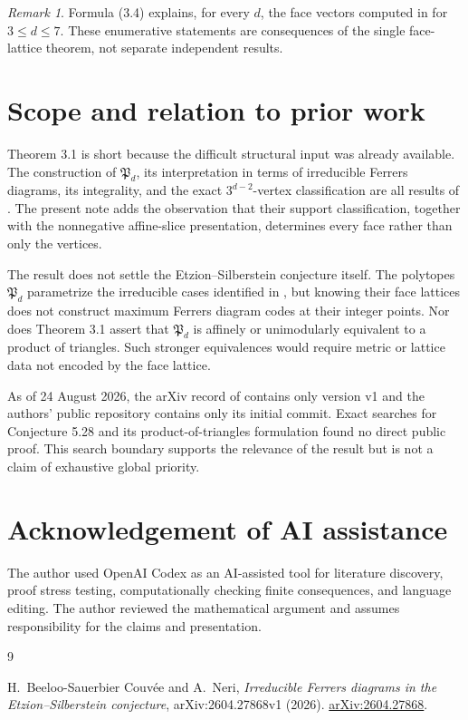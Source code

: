\documentclass[11pt]{article}
\theoremstyle{remark}
\newtheorem{remark}[theorem]{Remark}
\numberwithin{equation}{section}
\begin{document}
\Needspace{0.32\textheight}
\begin{remark}

Formula (3.4) explains, for every $d$, the face vectors computed in \cite{couvee2026} for
$3\leq d\leq7$. These enumerative statements are consequences of the single
face-lattice theorem, not separate independent results.

\end{remark}

\section{Scope and relation to prior work}


Theorem 3.1 is short because the difficult structural input was already
available. The construction of $\mathfrak P_d$, its interpretation in terms
of irreducible Ferrers diagrams, its integrality, and the exact
$3^{d-2}$-vertex classification are all results of \cite{couvee2026}. The present note adds
the observation that their support classification, together with the
nonnegative affine-slice presentation, determines every face rather than only
the vertices.

The result does not settle the Etzion--Silberstein conjecture itself.
The polytopes $\mathfrak P_d$ parametrize the irreducible cases identified in
\cite{couvee2026}, but knowing their face lattices does not construct maximum Ferrers
diagram codes at their integer points. Nor does Theorem 3.1 assert that
$\mathfrak P_d$ is affinely or unimodularly equivalent to a product of
triangles. Such stronger equivalences would require metric or lattice data not
encoded by the face lattice.

As of 24 August 2026, the arXiv record of \cite{couvee2026} contains only version v1 and the
authors' public repository contains only its initial commit. Exact searches
for Conjecture 5.28 and its product-of-triangles formulation found no direct
public proof. This search boundary supports the relevance of the result but
is not a claim of exhaustive global priority.

\section*{Acknowledgement of AI assistance}


The author used OpenAI Codex as an AI-assisted tool for literature discovery,
proof stress testing, computationally checking finite consequences, and
language editing. The author reviewed the mathematical argument and assumes
responsibility for the claims and presentation.

\begin{thebibliography}{9}
\footnotesize
\raggedright

H.~Beeloo-Sauerbier Couv\'ee and A.~Neri,
\emph{Irreducible Ferrers diagrams in the Etzion--Silberstein conjecture},
arXiv:2604.27868v1 (2026).
\href{https://arxiv.org/abs/2604.27868}{arXiv:2604.27868}.

\end{thebibliography}
\end{document}
